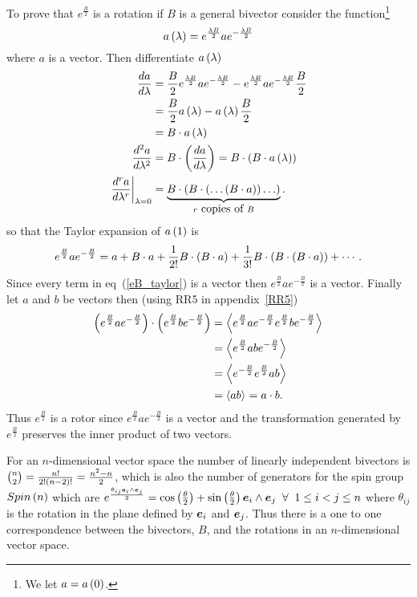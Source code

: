 To prove that $e^{\frac{B}{2}}$ is a rotation if $B$ is a general bivector consider the function\footnote{
We let $a = {a}\left ( {0} \right )$.}
\begin{equation}
	{a}\left ( {\lambda} \right ) = e^{\frac{\lambda B}{2}}ae^{-\frac{\lambda B}{2}}
\end{equation}
where $a$ is a vector. Then differentiate  ${a}\left ( {\lambda} \right )$
\begin{align}
	\displaystyle\frac{d{a}}{d{\lambda}} &= \frac{B}{2}e^{\frac{\lambda B}{2}}ae^{-\frac{\lambda B}{2}} -
	                     e^{\frac{\lambda B}{2}}ae^{-\frac{\lambda B}{2}}\frac{B}{2} \nonumber \\
	                   &= \frac{B}{2}{a}\left ( {\lambda} \right ) - {a}\left ( {\lambda} \right )\frac{B}{2} \nonumber \\
	                   &= B\cdot {a}\left ( {\lambda} \right ) \\
	\displaystyle\frac{d^{2}{a}}{d{\lambda}^{2}} &= B\cdot\left ( {\displaystyle\frac{d{a}}{d{\lambda}}} \right ) = B\cdot\left ( {B\cdot {a}\left ( {\lambda} \right )} \right )\\
	\left . \displaystyle\frac{d^{r}{a}}{d{\lambda}^{r}}\right |_{\lambda=0} &= 
	       \underbrace{B\cdot\left ( {B\cdot\left ( {\ldots\left ( {B\cdot a} \right )} \right )\ldots} \right )}_{r\mbox{ copies of }B}.               
\end{align}
so that the Taylor expansion of ${a}\left ( {1} \right )$ is
\begin{equation}\label{eB_taylor}
	e^{\frac{B}{2}}ae^{-\frac{B}{2}} = a + B\cdot a +\frac{1}{2!}B\cdot\left ( {B\cdot a} \right ) 
		+ \frac{1}{3!}B\cdot\left ( {B\cdot\left ( {B\cdot a} \right )} \right ) + \cdots.
\end{equation}
Since every term in eq~(\ref{eB_taylor}) is a vector then $e^{\frac{B}{2}}ae^{-\frac{B}{2}}$ is a vector.
Finally let $a$ and $b$ be vectors then (using RR5 in appendix~\ref{RR5})
\begin{align}
	\left ( {e^{\frac{B}{2}}ae^{-\frac{B}{2}}} \right )\cdot \left ( {e^{\frac{B}{2}}be^{-\frac{B}{2}}} \right ) &= 
		\left < {e^{\frac{B}{2}}ae^{-\frac{B}{2}}e^{\frac{B}{2}}be^{-\frac{B}{2}}} \right >_{} \nonumber \\
		& = \left < {e^{\frac{B}{2}}abe^{-\frac{B}{2}}} \right >_{} \nonumber \\
		& = \left < {e^{-\frac{B}{2}}e^{\frac{B}{2}}ab} \right >_{} \nonumber \\
		& = \left < {ab} \right >_{} = a \cdot b.
\end{align}
Thus $e^{\frac{B}{2}}$ is a rotor since $e^{\frac{B}{2}}ae^{-\frac{B}{2}}$ is a vector and the transformation
generated by $e^{\frac{B}{2}}$ preserves the inner product of two vectors.

For an $n$-dimensional vector space the number of linearly independent bivectors is 
$\binom{n}{2} = \frac{n!}{2!\left ( {n-2} \right )!} = \frac{n^{2}-n}{2}$, which is also the number of generators for the
spin group ${Spin}\left ( {n} \right )$ which are 
$e^{\frac{\theta_{ij}\bm{e}_{i}\wedge\bm{e}_{j}}{2}} = {\cos}\left ( {\frac{\theta}{2}} \right )
+{\sin}\left ( {\frac{\theta}{2}} \right )\bm{e}_{i}\wedge\bm{e}_{j}\;\;\forall\;\; 1\le i < j \le n$ where $\theta_{ij}$ is the rotation
in the plane defined by $\bm{e}_{i}$ and $\bm{e}_{j}$.  Thus there is a one to one correspondence between the bivectors,
$B$, and the rotations in an $n$-dimensional vector space.

